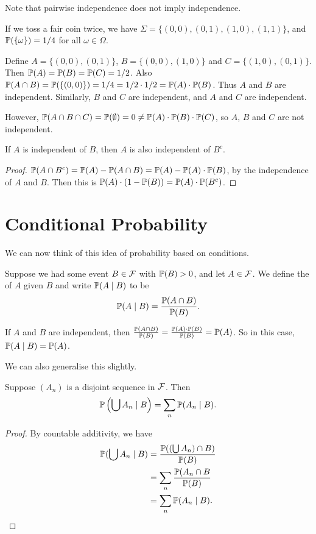 \documentclass[a4paper]{scrreprt}
\begin{document}
Note that pairwise independence does not imply independence.

\begin{example}
	If we toss a fair coin twice, we have $\Sigma = \{(0, 0), (0, 1), (1, 0), (1, 1)\}$, and $\mathbb{P}(\{\omega\}) = 1/4$ for all $\omega \in \Omega$.

Define $A = \{(0, 0), (0, 1)\}$, $B = \{(0, 0), (1,0)\}$ and $C = \{(1, 0), (0, 1)\}$. Then $\mathbb{P}(A) = \mathbb{P}(B) = \mathbb{P}(C) = 1/2$. Also $\mathbb{P}(A \cap B) = \mathbb{P}(\{(0, 0)\}) = 1/4 = 1/2 \cdot 1/2 = \mathbb{P}(A) \cdot \mathbb{P}(B)$. Thus $A$ and $B$ are independent. Similarly, $B$ and $C$ are independent, and $A$ and $C$ are independent.

However, $\mathbb{P}(A \cap B \cap C) = \mathbb{P}(\emptyset) = 0 \neq \mathbb{P}(A) \cdot \mathbb{P}(B) \cdot \mathbb{P}(C)$, so $A$, $B$ and $C$ are not independent. 
\end{example}

\begin{proposition}
	If $A$ is independent of $B$, then $A$ is also independent of $B^c$.
\end{proposition}
\begin{proof}
	$\mathbb{P}(A \cap B^c) = \mathbb{P}(A) - \mathbb{P}(A \cap B) = \mathbb{P}(A) - \mathbb{P}(A) \cdot \mathbb{P}(B)$, by the independence of $A$ and $B$. Then this is $\mathbb{P}(A)\cdot (1 - \mathbb{P}(B)) = \mathbb{P}(A) \cdot \mathbb{P}(B^c)$.
\end{proof}


\section{Conditional Probability}

We can now think of this idea of probability based on conditions.

\begin{definition}
	Suppose we had some event $B \in \mathcal{F}$ with $\mathbb{P}(B) > 0$, and let $A \in \mathcal{F}$. We define the  of $A$ given $B$
and write $\mathbb{P}(A \mid B)$ to be
$$
\mathbb{P}(A \mid B) = \frac{\mathbb{P}(A \cap B)}{\mathbb{P}(B)}.
$$
\end{definition}

If $A$ and $B$ are independent, then $\frac{\mathbb{P}(A \cap B)}{\mathbb{P}(B)} = \frac{\mathbb{P}(A) \cdot \mathbb{P}(B)}{\mathbb{P}(B)} = \mathbb{P}(A)$. So in this case, $\mathbb{P}(A \mid B) = \mathbb{P}(A)$.

We can also generalise this slightly.

\begin{proposition}
	Suppose $(A_n)$ is a disjoint sequence in $\mathcal{F}$. Then
$$
\mathbb{P}\left(\bigcup A_n \mid B\right) = \sum_n \mathbb{P}(A_n \mid B).
$$
\end{proposition}
\begin{proof}
	By countable additivity, we have
	\begin{align*}
		\mathbb{P}(\bigcup A_n \mid B) &= \frac{\mathbb{P}((\bigcup A_n) \cap B)}{\mathbb{P}(B)} \\
		&= \sum_n \frac{\mathbb{P}(A_n \cap B}{\mathbb{P}(B)}\\
		&= \sum_n \mathbb{P}(A_n \mid B).
	\end{align*}
\end{proof}
\end{document}
